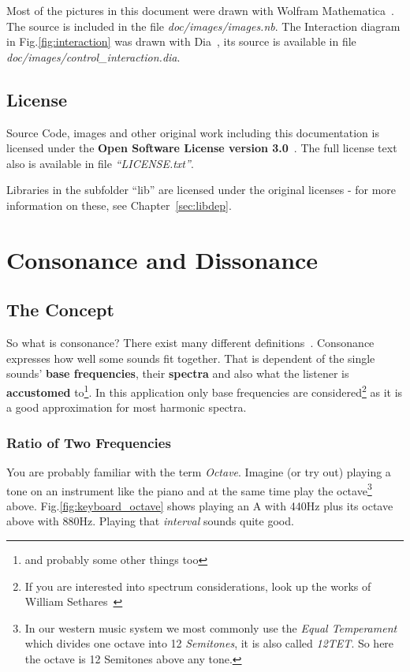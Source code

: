 \documentclass[12pt,a4paper,titlepage,oneside]{report}
\begin{document}
Most of the pictures in this document were drawn with Wolfram Mathematica\textregistered{}~\cite{bib:mathematica}. The source is included in the file \emph{doc/images/images.nb}. The Interaction diagram in Fig.\ref{fig:interaction} was drawn with Dia~\cite{bib:dia}, its source is available in file \emph{doc/images/control\_interaction.dia}.


\section{License}

Source Code, images and other original work including this documentation is licensed under the \textbf{Open Software License version 3.0}~\cite{bib:osl}. The full license text also is available in file \emph{``LICENSE.txt''}.

Libraries in the subfolder ``lib'' are licensed under the original licenses - for more information on these, see Chapter~\ref{sec:libdep}. 


\chapter{Consonance and Dissonance}
\label{chap:consonance}

\section{The Concept}

So what is consonance? There exist many different definitions~\cite{bib:cons_diss}. Consonance expresses how well some sounds fit together. That is dependent of the single sounds' \textbf{base frequencies}, their \textbf{spectra} and also what the listener is \textbf{accustomed} to\footnote{and probably some other things too}. In this application only base frequencies are considered\footnote{If you are interested into spectrum considerations, look up the works of William Sethares~\cite{bib:sethWiki, bib:adaptun}} as it is a good approximation for most harmonic spectra.


\subsection{Ratio of Two Frequencies}

You are probably familiar with the term \emph{Octave}. Imagine (or try out) playing a tone on an instrument like the piano and at the same time play the octave\footnote{In our western music system we most commonly use the \emph{Equal Temperament}~\cite{bib:12tet} which divides one octave into 12 \emph{Semitones}, it is also called \emph{12TET}. So here the octave is 12 Semitones above any tone.} above. Fig.\ref{fig:keyboard_octave} shows playing an A with 440Hz plus its octave above with 880Hz. Playing that \emph{interval} sounds quite good.
\end{document}
